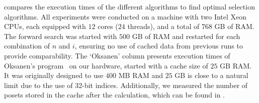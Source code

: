 \documentclass[twoside,leqno,twocolumn]{article}
\begin{document}
 compares the execution times of the different algorithms to find optimal selection algorithms.
All experiments were conducted on a machine with two Intel Xeon CPUs, each equipped with $12$ cores ($24$ threads), and a total of $768$ GB of RAM.
The forward search was started with $500$ GB of RAM and restarted for each combination of $n$ and $i$, ensuring no use of cached data from previous runs to provide comparability.
The `Oksanen' column presents execution times of Oksanen's program~\cite{Oksanen} on our hardware, started with a cache size of $25$ GB RAM.
It was originally designed to use $400$ MB RAM and $25$ GB is close to a natural limit due to the use of 32-bit indices.
Additionally, we measured the number of posets stored in the cache after the calculation, which can be found in .
\end{document}
